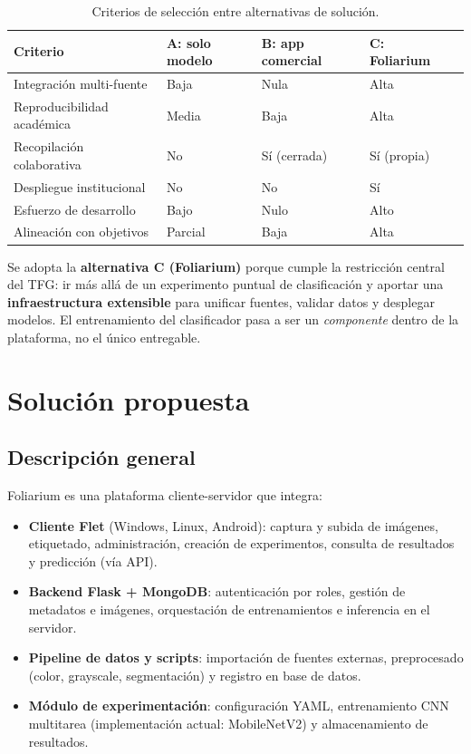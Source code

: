 \documentclass[11pt,spanish,listoffigures,listoftables]{tfgetsinf}
\begin{document}
\begin{table}[htbp]
\centering
\caption{Criterios de selección entre alternativas de solución.}
\label{tab:criterios-solucion}
\small
\begin{tabular}{p{4cm}p{2cm}p{2cm}p{2cm}p{2.5cm}}
\hline
\textbf{Criterio} & \textbf{A: solo modelo} & \textbf{B: app comercial} & \textbf{C: Foliarium} \\
\hline
Integración multi-fuente & Baja & Nula & Alta \\
Reproducibilidad académica & Media & Baja & Alta \\
Recopilación colaborativa & No & Sí (cerrada) & Sí (propia) \\
Despliegue institucional & No & No & Sí \\
Esfuerzo de desarrollo & Bajo & Nulo & Alto \\
Alineación con objetivos & Parcial & Baja & Alta \\
\hline
\end{tabular}
\end{table}

Se adopta la \textbf{alternativa C (Foliarium)} porque cumple la restricción central del TFG: ir más allá de un experimento puntual de clasificación y aportar una \textbf{infraestructura extensible} para unificar fuentes, validar datos y desplegar modelos. El entrenamiento del clasificador pasa a ser un \textit{componente} dentro de la plataforma, no el único entregable.

\section{Solución propuesta}

\subsection{Descripción general}

Foliarium es una plataforma cliente-servidor que integra:

\begin{itemize}
    \item \textbf{Cliente Flet} (Windows, Linux, Android): captura y subida de imágenes, etiquetado, administración, creación de experimentos, consulta de resultados y predicción (vía API).
    \item \textbf{Backend Flask + MongoDB}: autenticación por roles, gestión de metadatos e imágenes, orquestación de entrenamientos e inferencia en el servidor.
    \item \textbf{Pipeline de datos y scripts}: importación de fuentes externas, preprocesado (color, grayscale, segmentación) y registro en base de datos.
    \item \textbf{Módulo de experimentación}: configuración YAML, entrenamiento CNN multitarea (implementación actual: MobileNetV2) y almacenamiento de resultados.
\end{itemize}
\end{document}
